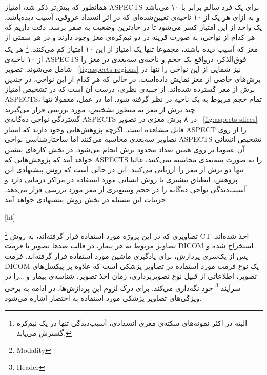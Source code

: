 همانطور که پیش‌تر ذکر شد، امتیاز ASPECTS برای یک فرد سالم برابر با ۱۰ می‌باشد و به ازای هر یک از ۱۰ ناحیه‌ی تعیین‌شده‌ای که در اثر انسداد عروقی، آسیب دیده‌باشد، یک واحد از این امتیاز کسر می‌شود تا در حادترین وضعیت به صفر برسد.
دقت داریم که هر کدام از نواحی، به صورت قرینه در دو نیم‌کره‌ی مغز وجود دارند و در هر سمتی از مغز که آسیب دیده باشند، مجموعا تنها یک امتیاز از این ۱۰ امتیاز کم می‌کنند.
\footnote{البته در اکثر نمونه‌های سکته‌ی مغزی انسدادی، آسیب‌دیدگی تنها در یک نیم‌کره گسترش می‌یابد.}
هر یک از ۱۰ ناحیه‌ی ASPECTS فوق‌الذکر، درواقع یک حجم و ناحیه‌ی سه‌بعدی در مغز را شامل می‌شوند.
تصویر ~\ref{fig:aspects-regions} نیز شمایی از این نواحی را تنها در برش‌های خاصی از مغز نمایش داده‌است.
در حالی که هر کدام از این نواحی، در چندین برش از مغز گسترده شده‌اند.
از جنبه‌ی نظری، درست آن است که در تشخیص امتیاز ASPECTS، تمام حجم مربوط به یک ناحیه در نظر گرفته شود.
اما در عمل، معمولا تنها چند برش از مغز به منظور تشخیص، مورد بررسی قرار می‌گیرند.\\

گستردگی نواحی ده‌گانه‌ی ASPECTS در ۸ برش مغزی در تصویر ~\ref{fig:aspects-slices} قابل مشاهده است.
اگرچه پژوهش‌هایی وجود دارند که امتیاز ASPECT را از روی تصاویر سه‌بعدی محاسبه می‌کنند اما 
ساختارشناسی نواحی ASPECTS تشخیص انسانی آن عموما بر روی همین تعداد محدود برش انجام می‌شود.
در بخش کارهای پیشین خواهد آمد که پژوهش‌هایی که ASPECTS را به صورت سه‌بعدی محاسبه نمی‌کنند، غالبا تنها دو برش از مغز را ارزیابی می‌کنند.
این در حالی است که روش پیشنهادی این پژوهش، انطباق بیشتری با روش انسانی مورد استفاده در مراکز درمانی دارد و 
آسیب‌دیدگی نواحی ده‌گانه را در حجم وسیع‌تری از مغز مورد بررسی قرار می‌دهد. جزئیات این مسئله در بخش روش پیشنهادی خواهد آمد.


[ht]


تصاویری که در این پروژه مورد استفاده قرار گرفته‌اند، به روش
\footnote{Modality}
 CT اخذ شده‌اند.
تصاویر مربوط به هر بیمار، در قالب صدها تصویر با فرمت DICOM استخراج شده و پس از یک‌سری پردازش، برای یادگیری ماشین مورد استفاده قرار گرفته‌اند.
فرمت DICOM یک نوع فرمت مورد استفاده در تصاویر پزشکی است که علاوه بر پیکسل‌های تصویر، اطلاعاتی از قبیل نوع تصویربرداری، زمان احذ تصویر، شناسه‌ی بیمار و \dots را در سرآیند
\footnote{Header}
خود نگه‌داری می‌کند.
برای درک لزوم این پردازش‌ها، در ادامه به برخی ویژگی‌های تصاویر پزشکی مورد استفاده به اختصار اشاره می‌شود.

